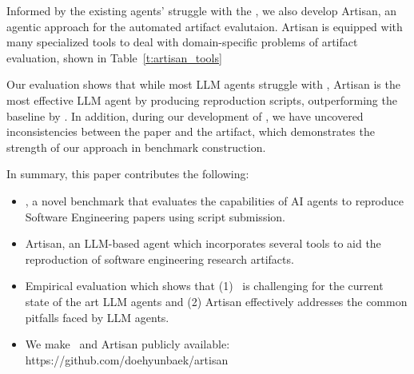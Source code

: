 Informed by the existing agents' struggle with the \benchmark, we also develop Artisan, an agentic approach for the automated artifact evalutaion.
Artisan is equipped with many specialized tools to deal with domain-specific problems of artifact evaluation, shown in Table~\ref{t:artisan_tools}

Our evaluation shows that while most LLM agents struggle with \benchmark, Artisan is the most effective LLM agent by producing \artisanpartial{} reproduction scripts, outperforming the baseline by \artisanpartialoutperform{}.
In addition, during our development of \benchmark, we have uncovered \inconsistencies{} inconsistencies between the paper and the artifact, which demonstrates the strength of our approach in benchmark construction.

In summary, this paper contributes the following:
\begin{itemize}
    \item \benchmark, a novel benchmark that evaluates the capabilities of AI agents to reproduce Software Engineering papers using script submission.
    \item Artisan, an LLM-based agent which incorporates several tools to aid the reproduction of software engineering research artifacts.
    \item Empirical evaluation which shows that (1) \benchmark~is challenging for the current state of the art LLM agents and (2) Artisan effectively addresses the common pitfalls faced by LLM agents.
    \item We make \benchmark~and Artisan publicly available: https://github.com/doehyunbaek/artisan
\end{itemize}
